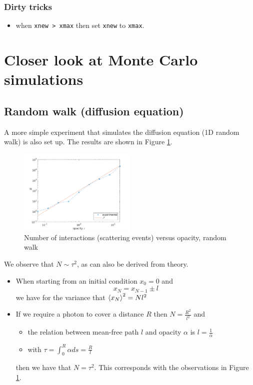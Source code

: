 \documentclass[../main/main.tex]{subfiles}
\begin{document}
\subsubsection{Dirty tricks}
\begin{itemize}
\item when \texttt{xnew > xmax} then set \texttt{xnew} to \texttt{xmax}.
\end{itemize}

\newpage
\section{Closer look at Monte Carlo simulations}
\label{diffusion_Monte_Carlo_mean_free_path}

\subsection{Random walk (diffusion equation)} A more simple experiment that simulates the diffusion equation (1D random walk) is also set up. The results are shown in Figure \ref{random_walk_N_vs_tau}.
	\begin{figure}[!htp]
	\centering
	\includegraphics[width=0.5\textwidth]{../../introductory_exercises/limb_darkening/data/diff_N_vs_opacity.png}
	\caption{Number of interactions (scattering events) versus 	opacity, random walk}
	\label{random_walk_N_vs_tau}
	\end{figure}
We observe that $N \sim \tau^2$, as can also be derived from theory.

\begin{itemize}
\item When starting from an initial condition $x_0 = 0$ and 
\begin{equation}
x_N = x_{N-1} \pm l
\end{equation}
we have for the variance that $\braket{x_N}^2 = N l^2$ 
\item If we require a photon to cover a distance $R$ then $N = \frac{R^2}{l^2}$ and
\begin{itemize}
\item the relation between mean-free path $l$ and opacity $\alpha$ is $l = \frac{1}{\alpha}$
\item with $\tau = \int_0^R \alpha ds = \frac{R}{l}$
\end{itemize}
then we have that $N = \tau^2$. This corresponds with the observations in Figure \ref{random_walk_N_vs_tau}.
\end{itemize}
\end{document}
